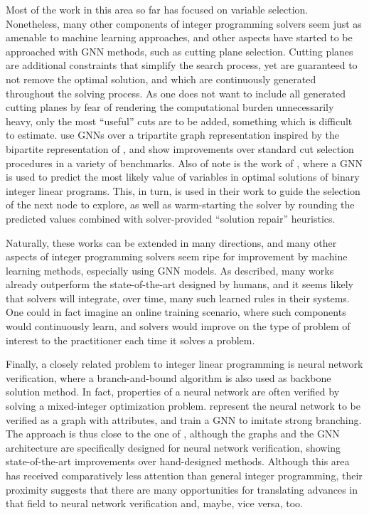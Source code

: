 \documentclass[twoside,11pt]{article}
\begin{document}
Most of the work in this area so far has focused on variable selection. Nonetheless, many other components of integer programming solvers seem just as amenable to machine learning approaches, and other aspects have started to be approached with GNN methods, such as cutting plane selection. Cutting planes are additional constraints that simplify the search process, yet are guaranteed to not remove the optimal solution, and which are continuously generated throughout the solving process. As one does not want to include all generated cutting planes by fear of rendering the computational burden unnecessarily heavy, only the most ``useful'' cuts are to be added, something which is difficult to estimate. \citet{paulus2022learning} use GNNs over a tripartite graph representation inspired by the bipartite representation of \citet{Gas+2019}, and show improvements over standard cut selection procedures in a variety of benchmarks. Also of note is the work of \citet{khalil2022mip}, where a GNN is used to predict the most likely value of variables in optimal solutions of binary integer linear programs. This, in turn, is used in their work to guide the selection of the next node to explore, as well as warm-starting the solver by rounding the predicted values combined with solver-provided ``solution repair'' heuristics.

Naturally, these works can be extended in many directions, and many other aspects of integer programming solvers seem ripe for improvement by machine learning methods, especially using GNN models. As described, many works already outperform the state-of-the-art designed by humans,  and it seems likely that solvers will integrate, over time, many such learned rules in their systems. One could in fact imagine an online training scenario, where such components would continuously learn, and solvers would improve on the type of problem of interest to the practitioner each time it solves a problem.

Finally, a closely related problem to integer linear programming is neural network verification, where a branch-and-bound algorithm is also used as backbone solution method. In fact, properties of a neural network are often verified by solving a mixed-integer optimization problem. \citet{Lu2019} represent the neural network to be verified as a graph with attributes, and train a GNN to imitate strong branching. The approach is thus close to the one of \citet{Gas+2019}, although the graphs and the GNN architecture are specifically designed for neural network verification, showing state-of-the-art improvements over hand-designed methods. Although this area has received comparatively less attention than general integer programming, their proximity suggests that there are many opportunities for translating advances in that field to neural network verification and, maybe, vice versa, too.
\end{document}
